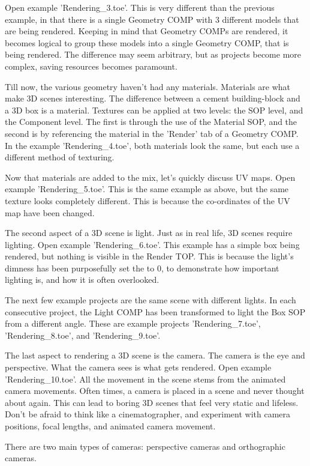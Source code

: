 \begin{fullwidth}
Open example 'Rendering\_3.toe'. This is very different than the previous example, in that there is a single Geometry COMP with 3 different models that are being rendered. Keeping in mind that Geometry COMPs are rendered, it becomes logical to group these models into a single Geometry COMP, that is being rendered. The difference may seem arbitrary, but as projects become more complex, saving resources becomes paramount.

Till now, the various geometry haven't had any materials. Materials are what make 3D scenes interesting. The difference between a cement building-block and a 3D box is a material. Textures can be applied at two levels: the SOP level, and the Component level. The first is through the use of the Material SOP, and the second is by referencing the material in the 'Render' tab of a Geometry COMP. In the example 'Rendering\_4.toe', both materials look the same, but each use a different method of texturing.

Now that materials are added to the mix, let's quickly discuss UV maps. Open example 'Rendering\_5.toe'. This is the same example as above, but the same texture looks completely different. This is because the co-ordinates of the UV map have been changed.

The second aspect of a 3D scene is light. Just as in real life, 3D scenes require lighting. Open example 'Rendering\_6.toe'. This example has a simple box being rendered, but nothing is visible in the Render TOP. This is because the light's dimness has been purposefully set the to 0, to demonstrate how important lighting is, and how it is often overlooked.

The next few example projects are the same scene with different lights. In each consecutive project, the Light COMP has been transformed to light the Box SOP from a different angle. These are example projects 'Rendering\_7.toe', 'Rendering\_8.toe', and 'Rendering\_9.toe'.

The last aspect to rendering a 3D scene is the camera. The camera is the eye and perspective. What the camera sees is what gets rendered. Open example 'Rendering\_10.toe'. All the movement in the scene stems from the animated camera movements. Often times, a camera is placed in a scene and never thought about again. This can lead to boring 3D scenes that feel very static and lifeless. Don't be afraid to think like a cinematographer, and experiment with camera positions, focal lengths, and animated camera movement.

There are two main types of cameras: perspective cameras and orthographic cameras.


\end{fullwidth}
